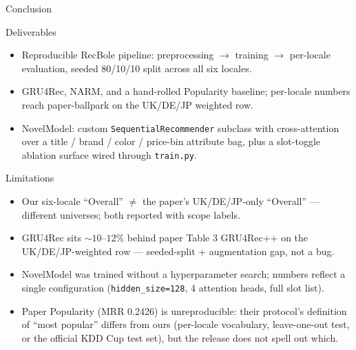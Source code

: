 \documentclass[10pt,aspectratio=169]{beamer}
\newcommand{\code}[1]{\texttt{#1}}
\begin{document}
\begin{frame}{Conclusion}
  \begin{block}{Deliverables}
    \scriptsize
    \begin{itemize}\setlength\itemsep{0.15em}
      \item Reproducible RecBole pipeline: preprocessing $\to$ training $\to$ per-locale evaluation, seeded 80/10/10 split across all six locales.
      \item GRU4Rec, NARM, and a hand-rolled Popularity baseline; per-locale numbers reach paper-ballpark on the UK/DE/JP weighted row.
      \item NovelModel: custom \code{SequentialRecommender} subclass with cross-attention over a title / brand / color / price-bin attribute bag, plus a slot-toggle ablation surface wired through \code{train.py}.
    \end{itemize}
  \end{block}

  \begin{block}{Limitations}
    \scriptsize
    \begin{itemize}\setlength\itemsep{0.3em}
      \item Our six-locale ``Overall'' $\ne$ the paper's UK/DE/JP-only ``Overall'' --- different universes; both reported with scope labels.
      \item GRU4Rec sits ${\sim}10\text{--}12\%$ behind paper Table 3 GRU4Rec++ on the UK/DE/JP-weighted row --- seeded-split + augmentation gap, not a bug.
      \item NovelModel was trained without a hyperparameter search; numbers reflect a single configuration (\code{hidden\_size=128}, 4 attention heads, full slot list).
      \item Paper Popularity (MRR 0.2426) is unreproducible: their protocol's definition of ``most popular'' differs from ours (per-locale vocabulary, leave-one-out test, or the official KDD Cup test set), but the release does not spell out which.
    \end{itemize}
  \end{block}
\end{frame}
\end{document}

